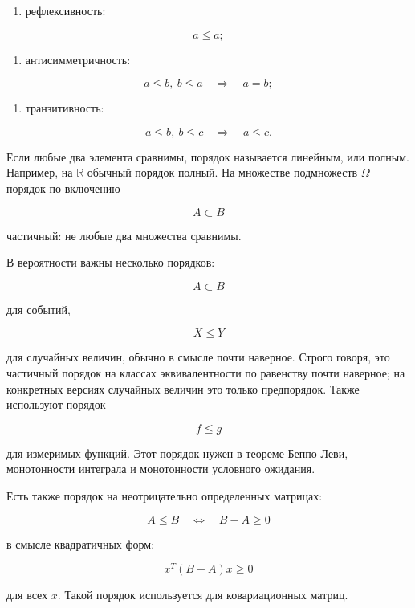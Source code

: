 \documentclass[
  11pt,
  a4paper,
]{article}
\providecommand{\tightlist}{%
  \setlength{\itemsep}{0pt}\setlength{\parskip}{0pt}}
\begin{document}
\begin{enumerate}
\def\labelenumi{\arabic{enumi}.}
\tightlist
\item
  рефлексивность:
\end{enumerate}

\[
a\le a;
\]

\begin{enumerate}
\def\labelenumi{\arabic{enumi}.}
\setcounter{enumi}{1}
\tightlist
\item
  антисимметричность:
\end{enumerate}

\[
a\le b,\ b\le a\quad\Rightarrow\quad a=b;
\]

\begin{enumerate}
\def\labelenumi{\arabic{enumi}.}
\setcounter{enumi}{2}
\tightlist
\item
  транзитивность:
\end{enumerate}

\[
a\le b,\ b\le c\quad\Rightarrow\quad a\le c.
\]

Если любые два элемента сравнимы, порядок называется линейным, или
полным. Например, на \(\mathbb R\) обычный порядок полный. На множестве
подмножеств \(\Omega\) порядок по включению

\[
A\subset B
\]

частичный: не любые два множества сравнимы.

В вероятности важны несколько порядков:

\[
A\subset B
\]

для событий,

\[
X\le Y
\]

для случайных величин, обычно в смысле почти наверное. Строго говоря,
это частичный порядок на классах эквивалентности по равенству почти
наверное; на конкретных версиях случайных величин это только
предпорядок. Также используют порядок

\[
f\le g
\]

для измеримых функций. Этот порядок нужен в теореме Беппо Леви,
монотонности интеграла и монотонности условного ожидания.

Есть также порядок на неотрицательно определенных матрицах:

\[
A\le B
\quad\Longleftrightarrow\quad
B-A\ge0
\]

в смысле квадратичных форм:

\[
x^T(B-A)x\ge0
\]

для всех \(x\). Такой порядок используется для ковариационных матриц.
\end{document}
